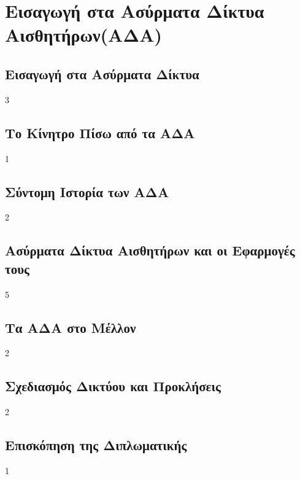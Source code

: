 


\chapter{Εισαγωγή στα Ασύρματα Δίκτυα Αισθητήρων(ΑΔΑ)}

\section{Εισαγωγή στα Ασύρματα Δίκτυα}
3 %
\section{Το Κίνητρο Πίσω από τα ΑΔΑ}
1
\section{Σύντομη Ιστορία των ΑΔΑ}
2
\section{Ασύρματα Δίκτυα Αισθητήρων και οι Εφαρμογές τους}
5
\section{Τα ΑΔΑ στο Μέλλον}
2 %
\section{Σχεδιασμός Δικτύου και Προκλήσεις}
2
\section{Επισκόπηση της Διπλωματικής}
1
\label{ch:wsns}